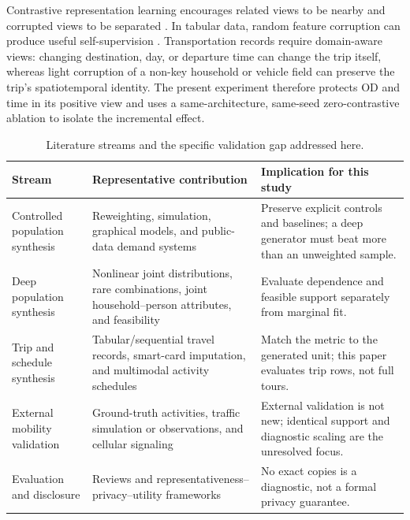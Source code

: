 \documentclass[numbered]{trbunofficial}
\begin{document}
Contrastive representation learning encourages related views to be nearby and corrupted views to be separated \cite{oord2018cpc}. In tabular data, random feature corruption can produce useful self-supervision \cite{bahri2022scarf}. Transportation records require domain-aware views: changing destination, day, or departure time can change the trip itself, whereas light corruption of a non-key household or vehicle field can preserve the trip's spatiotemporal identity. The present experiment therefore protects OD and time in its positive view and uses a same-architecture, same-seed zero-contrastive ablation to isolate the incremental effect.

\begin{table}[!htbp]
\caption{Literature streams and the specific validation gap addressed here.}
\label{tab:literature}
\centering
\setlength{\tabcolsep}{4pt}
\begin{tabularx}{\textwidth}{P{0.20\textwidth}Y Y}
\toprule
\textbf{Stream} & \textbf{Representative contribution} & \textbf{Implication for this study} \\
\midrule
Controlled population synthesis & Reweighting, simulation, graphical models, and public-data demand systems \cite{beckman1996creating,farooq2013simulation,sun2015bayesian,horl2021paris} & Preserve explicit controls and baselines; a deep generator must beat more than an unweighted sample. \\
Deep population synthesis & Nonlinear joint distributions, rare combinations, joint household--person attributes, and feasibility \cite{borysov2019microagents,garrido2020rare,aemmer2022joint,kim2023feasible} & Evaluate dependence and feasible support separately from marginal fit. \\
Trip and schedule synthesis & Tabular/sequential travel records, smart-card imputation, and multimodal activity schedules \cite{badumarfo2022composite,kim2022tripchains,kieu2023smartcard,lee2025collagan,shone2025scheduling} & Match the metric to the generated unit; this paper evaluates trip rows, not full tours. \\
External mobility validation & Ground-truth activities, traffic simulation or observations, and cellular signaling \cite{yin2018activities,ma2025foundation,vo2026harnessing} & External validation is not new; identical support and diagnostic scaling are the unresolved focus. \\
Evaluation and disclosure & Reviews and representativeness--privacy--utility frameworks \cite{kapp2024review,choi2025tutorial,wu2026evaluation,stadler2022groundhog} & No exact copies is a diagnostic, not a formal privacy guarantee. \\
\bottomrule
\end{tabularx}
\end{table}
\end{document}
